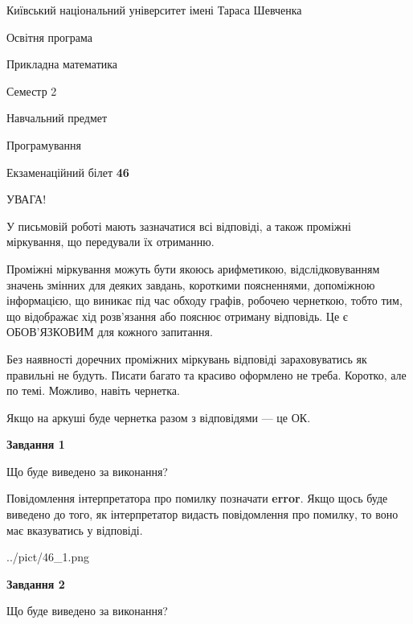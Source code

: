 \documentclass[12pt, ukrainian]{article}
\begin{document}
{{\begin {small}\par
{ \center  Київський національний університет імені Тараса Шевченка \par}
{\parbox {5 cm}{Освітня програма \hfill}{\parbox {7 cm}{Прикладна математика \hfill}}\parbox {6 cm}{\hfill Семестр 2}}\par
{\parbox {5 cm} {Навчальний предмет \hfill}\parbox {7 cm}{Програмування \hfill}\parbox {6cm}{\hfill}\par}\vspace{-7pt} \end{small}}{\center Екзаменаційний білет \No \textbf
{ 46 }\par}}
{
\begin {large}
УВАГА!

У письмовій роботі мають зазначатися всі відповіді, а також проміжні міркування, що передували їх отриманню.

Проміжні міркування можуть бути якоюсь арифметикою, відслідковуванням зна\-чень змінних для деяких завдань,
короткими поясненнями, допоміжною інформацією, що виникає під час обходу графів, робочею чернеткою,
тобто тим, що відображає хід розв’язання або пояснює отриману відповідь.
Це є ОБОВ’ЯЗКОВИМ для кожного запитання.

Без наявності доречних проміжних міркувань відповіді зараховуватись як правиль\-ні не будуть.
Писати багато та красиво оформлено не треба. Коротко, але по темі. Можли\-во, навіть чернетка.

Якщо на аркуші буде чернетка разом з відповідями --- це ОК.

\newpage

{\begin {center}\textbf{Завдання 1}\end {center}}\par
Що буде виведено за виконання?

Повідомлення інтерпретатора про помилку позначати \textbf{error}.
Якщо щось буде виведено до того, як інтерпретатор видасть повідомлення про помилку, 
то воно має вказуватись у відповіді. \par


\begin{center}
	{../pict/46_1.png}
\end{center}
\newpage

{\begin {center}\textbf{Завдання 2}\end {center}}\par
Що буде виведено за виконання?


\end{large}}
\end{document}
